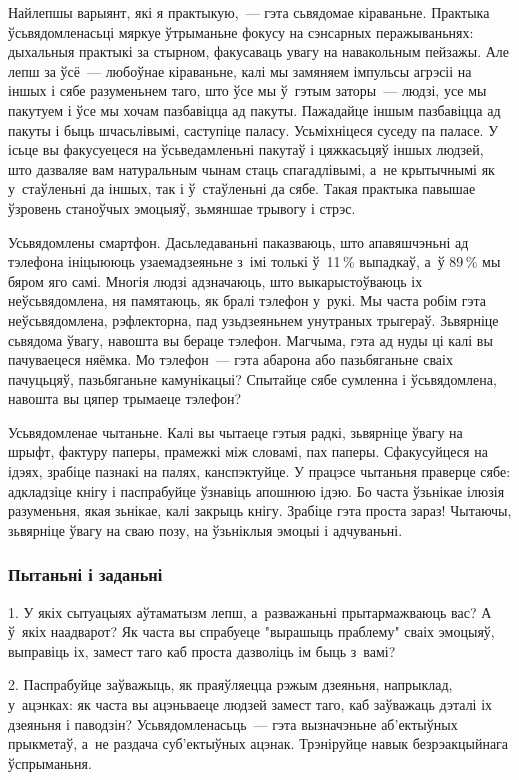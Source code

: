 Найлепшы варыянт, які я практыкую,~--- гэта сьвядомае кіраваньне. Практыка ўсьвядомленасьці мяркуе ўтрыманьне фокусу на сэнсарных перажываньнях: дыхальныя практыкі за стырном, факусаваць увагу на навакольным пейзажы. Але лепш за ўсё~--- любоўнае кіраваньне, калі мы замяняем імпульсы агрэсіі на іншых і сябе разуменьнем таго, што ўсе мы ў~гэтым заторы~--- людзі, усе мы пакутуем і ўсе мы хочам пазбавіцца ад пакуты. Пажадайце іншым пазбавіцца ад пакуты і быць шчасьлівымі, саступіце паласу. Усьміхніцеся суседу па паласе. У ісьце вы факусуецеся на ўсьведамленьні пакутаў і цяжкасьцяў іншых людзей, што дазваляе вам натуральным чынам стаць спагадлівымі, а~не крытычнымі як у~стаўленьні да іншых, так і ў~стаўленьні да сябе. Такая практыка павышае ўзровень станоўчых эмоцыяў, зьмяншае трывогу і стрэс.

Усьвядомлены смартфон. Дасьледаваньні паказваюць, што апавяшчэньні ад тэлефона ініцыююць узаемадзеяньне з~імі толькі ў~11\,\% выпадкаў, а~ў 89\,\% мы бяром яго самі. Многія людзі адзначаюць, што выкарыстоўваюць іх неўсьвядомлена, ня памятаюць, як бралі тэлефон у~рукі. Мы часта робім гэта неўсьвядомлена, рэфлекторна, пад узьдзеяньнем унутраных трыгераў. Зьвярніце сьвядома ўвагу, навошта вы бераце тэлефон. Магчыма, гэта ад нуды ці калі вы пачуваецеся няёмка. Мо тэлефон~--- гэта абарона або пазьбяганьне сваіх пачуцьцяў, пазьбяганьне камунікацыі? Спытайце сябе сумленна і ўсьвядомлена, навошта вы цяпер трымаеце тэлефон?

Усьвядомленае чытаньне. Калі вы чытаеце гэтыя радкі, зьвярніце ўвагу на шрыфт, фактуру паперы, прамежкі між словамі, пах паперы. Сфакусуйцеся на ідэях, зрабіце пазнакі на палях, канспэктуйце. У працэсе чытаньня праверце сябе: адкладзіце кнігу і паспрабуйце ўзнавіць апошнюю ідэю. Бо часта ўзьнікае ілюзія разуменьня, якая зьнікае, калі закрыць кнігу. Зрабіце гэта проста зараз! Чытаючы, зьвярніце ўвагу на сваю позу, на ўзьніклыя эмоцыі і адчуваньні.

\subsubsection{Пытаньні і заданьні}

1. У якіх сытуацыях аўтаматызм лепш, а~разважаньні прытармажваюць вас? А ў~якіх наадварот? Як часта вы спрабуеце "вырашыць праблему" сваіх эмоцыяў, выправіць іх, замест таго каб проста дазволіць ім быць з~вамі?

2. Паспрабуйце заўважыць, як праяўляецца рэжым дзеяньня, напрыклад, у~ацэнках: як часта вы ацэньваеце людзей замест таго, каб заўважаць дэталі іх дзеяньня і паводзін? Усьвядомленасьць~--- гэта вызначэньне аб'ектыўных прыкметаў, а~не раздача суб'ектыўных ацэнак. Трэніруйце навык безрэакцыйнага ўспрыманьня.

